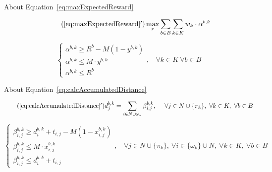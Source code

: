 \documentclass[12pt ]{article}
\begin{document}
About Equation~\ref{eq:maxExpectedReward}

\begin{equation} \tag{\ref{eq:maxExpectedReward}$^\prime$}
	\max_x \sum_{ b \in B} \sum_{k \in K} w_k \cdot \alpha^{b,k}
	\label{eq:maxExpectedReward_linearization}
\end{equation}

\begin{equation}
	\begin{cases} 
      	\alpha^{b,k} \ge R^b - M ( 1 - y^{b,k} ) \\
      	\alpha^{b,k} \le M \cdot y^{b,k} \\
      	\alpha^{b,k} \le R^b
   	\end{cases}
   	,~~~~\forall k \in K~\forall b \in B
\label{eq:linearization_alpha}
\end{equation}

\vspace{0.5cm}

About Equation~\ref{eq:calcAccumulatedDistance}

\begin{equation} \tag{\ref{eq:calcAccumulatedDistance}$^\prime$}
	d_j^{b,k} = \sum_{ i \in N \cup \omega_k} \beta^{b,k}_{i,j},~~~~\forall j \in N \cup \{ \pi_{k} \},~\forall k \in K,~\forall b \in B
	\label{eq:calcAccumulatedDistance_linearization}
\end{equation}

\begin{equation}
	\begin{cases} 
      	\beta^{b,k}_{i,j} \ge d^{b,k}_{i} + t_{i,j} - M ( 1 - x^{b,k}_{i,j} ) \\
      	\beta^{b,k}_{i,j} \le M \cdot x^{b,k}_{i,j} \\
      	\beta^{b,k}_{i,j} \le d^{b,k}_{i} + t_{i,j}
   	\end{cases}
   	,~~~~\forall j \in N \cup \{ \pi_{k} \},~\forall i \in \{ \omega_{k} \} \cup N,~\forall k \in K,~\forall b \in B
   \label{eq:linearization_beta}
\end{equation}
\end{document}
